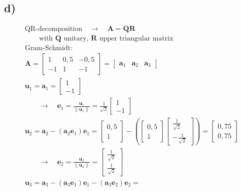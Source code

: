 \documentclass[fleqn]{article}
\begin{document}
\subsection*{d)}
\begin{align*}
	&\text{QR-decomposition}\quad\rightarrow\quad\mathbf{A=QR}& \\
	&\qquad\text{with $\mathbf{Q}$ unitary, $\mathbf{R}$ upper triangular matrix}& \\
	&\text{Gram-Schmidt:}& \\
	&\mathbf{A}=
	\begin{bmatrix}
	1 & 0,5 & -0,5 \\
	-1 & 1 & -1 
	\end{bmatrix}=\begin{bmatrix}\mathbf{a}_{1}&\mathbf{a}_{2}&\mathbf{a}_{3}\end{bmatrix}& \\
	&\mathbf{u}_{1}=\mathbf{a}_{1}=\begin{bmatrix}1\\-1\end{bmatrix}& \\
	&\qquad\rightarrow\quad\mathbf{e}_{1}=\frac{\mathbf{u}_{1}}{\|\mathbf{u}_{1}\|}=\frac{1}{\sqrt{2}}\begin{bmatrix}1\\-1\end{bmatrix}& \\
	&\mathbf{u}_{2}=\mathbf{a}_{2}-\left(\mathbf{a}_{2}\mathbf{e}_{1}\right)\mathbf{e}_{1}=\begin{bmatrix}0,5\\1\end{bmatrix}-\left(\begin{bmatrix}0,5\\1\end{bmatrix}\begin{bmatrix}\frac{1}{\sqrt{2}}\\-\frac{1}{\sqrt{2}}\end{bmatrix}\right)=\begin{bmatrix}0,75\\0,75\end{bmatrix}& \\
	&\qquad\rightarrow\quad\mathbf{e}_{2}=\frac{\mathbf{u}_{2}}{\|\mathbf{u}_{2}\|}=\begin{bmatrix}\frac{1}{\sqrt{2}}\\\frac{1}{\sqrt{2}}\end{bmatrix}& \\
	&\mathbf{u}_{3}=\mathbf{a}_{3}-\left(\mathbf{a}_{3}\mathbf{e}_{1}\right)\mathbf{e}_{1}-\left(\mathbf{a}_{3}\mathbf{e}_{2}\right)\mathbf{e}_{2}=& \\

\end{align*}
\end{document}
